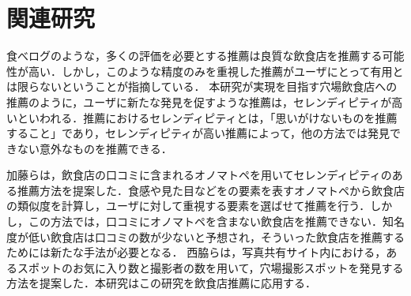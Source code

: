 \chapter{関連研究}

食べログのような，多くの評価を必要とする推薦は良質な飲食店を推薦する可能性が高い．しかし，このような精度のみを重視した推薦がユーザにとって有用とは限らないということが指摘している\cite{McNee}．
本研究が実現を目指す穴場飲食店への推薦のように，ユーザに新たな発見を促すような推薦は，セレンディピティが高いといわれる．推薦におけるセレンディピティとは，「思いがけないものを推薦すること」であり\cite{McNee}，セレンディピティが高い推薦によって，他の方法では発見できない意外なものを推薦できる\cite{Parameswaran}．\par
加藤ら\cite{onomatopoeia}は，飲食店の口コミに含まれるオノマトペを用いてセレンディピティのある推薦方法を提案した．食感や見た目などをの要素を表すオノマトペから飲食店の類似度を計算し，ユーザに対して重視する要素を選ばせて推薦を行う．しかし，この方法では，口コミにオノマトペを含まない飲食店を推薦できない．知名度が低い飲食店は口コミの数が少ないと予想され，そういった飲食店を推薦するためには新たな手法が必要となる．
西脇ら\cite{picture}は，写真共有サイト内における，あるスポットのお気に入り数と撮影者の数を用いて，穴場撮影スポットを発見する方法を提案した．本研究はこの研究を飲食店推薦に応用する．\par
